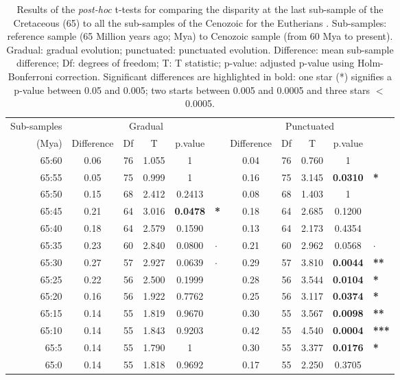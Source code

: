 \documentclass[12pt,letterpaper]{article}
\begin{document}
\begin{table}[ht]
\caption{Results of the \textit{post-hoc} t-tests for comparing the disparity at the last sub-sample of the Cretaceous (65) to all the sub-samples of the Cenozoic for the Eutherians \citep[data from][]{beckancient2014}. Sub-samples: reference sample (65 Million years ago; Mya) to Cenozoic sample (from 60 Mya to present). Gradual: gradual evolution; punctuated: punctuated evolution. Difference: mean sub-sample difference; Df: degrees of freedom; T: T statistic; p-value: adjusted p-value using Holm-Bonferroni correction. Significant differences are highlighted in bold: one star (*) signifies a p-value between 0.05 and 0.005; two starts between 0.005 and 0.0005 and three stars $<$ 0.0005.}
\label{tab:Tab_beck_raw}
\centering
\begin{tabular}{r|ccccl|ccccl}
  \hline
  Sub-samples & \multicolumn{5}{c|}{Gradual} & \multicolumn{5}{c}{Punctuated} \\
  (Mya) & Difference & Df & T & p.value & & Difference & Df & T & p.value &\\ 
  \hline
  65:60 & 0.06 & 76 & 1.055 & 1      & & 0.04 & 76 & 0.760 & 1      &\\ 
  65:55 & 0.05 & 75 & 0.999 & 1      & & 0.16 & 75 & 3.145 & \textbf{0.0310} & \textbf{*} \\ 
  65:50 & 0.15 & 68 & 2.412 & 0.2413 & & 0.08 & 68 & 1.403 & 1      &\\ 
  65:45 & 0.21 & 64 & 3.016 & \textbf{0.0478} & \textbf{*} & 0.18 & 64 & 2.685 & 0.1200 &\\ 
  65:40 & 0.18 & 64 & 2.579 & 0.1590 & & 0.13 & 64 & 2.173 & 0.4354 &\\ 
  65:35 & 0.23 & 60 & 2.840 & 0.0800 & $\cdotp$ & 0.21 & 60 & 2.962 & 0.0568 & $\cdotp$ \\ 
  65:30 & 0.27 & 57 & 2.927 & 0.0639 & $\cdotp$ & 0.29 & 57 & 3.810 & \textbf{0.0044} & \textbf{**} \\ 
  65:25 & 0.22 & 56 & 2.500 & 0.1999 & & 0.28 & 56 & 3.544 & \textbf{0.0104} & \textbf{*} \\ 
  65:20 & 0.16 & 56 & 1.922 & 0.7762 & & 0.25 & 56 & 3.117 & \textbf{0.0374} & \textbf{*}\\ 
  65:15 & 0.14 & 55 & 1.819 & 0.9670 & & 0.30 & 55 & 3.567 & \textbf{0.0098} & \textbf{**}\\ 
  65:10 & 0.14 & 55 & 1.843 & 0.9203 & & 0.42 & 55 & 4.540 & \textbf{0.0004} & \textbf{***} \\ 
  65:5  & 0.14 & 55 & 1.790 & 1      & & 0.30 & 55 & 3.377 & \textbf{0.0176} & \textbf{*} \\ 
  65:0  & 0.14 & 55 & 1.818 & 0.9692 & & 0.17 & 55 & 2.250 & 0.3705 \\ 
   \hline
\end{tabular}
\end{table}
\end{document}

